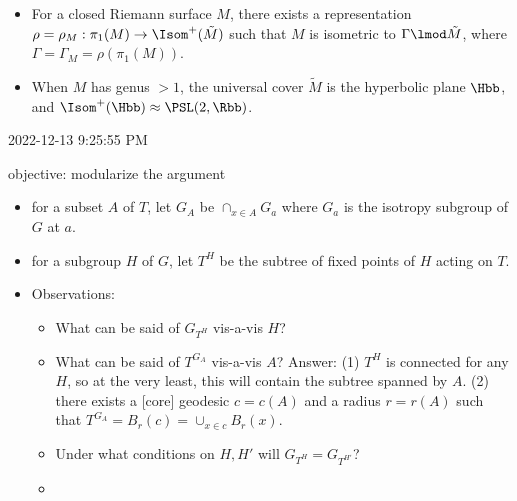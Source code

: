 \documentclass{amsart}
\begin{document}
\begin{itemize}
	\item For a closed Riemann surface $M$, there exists a representation $\rho=\rho_M : \pi_1(M) \to \Isom^+(\tilde{M})$ such that $M$ is isometric to $\Gamma \lmod \tilde{M}$, where $\Gamma=\Gamma_M = \rho(\pi_1(M))$.
	\item When $M$ has genus $>1$, the universal cover $\tilde{M}$ is the hyperbolic plane $\Hbb$, and $\Isom^+(\Hbb) \approx \PSL(2,\Rbb)$.
\end{itemize}
2022-12-13 9:25:55 PM

objective: modularize the argument
\begin{itemize}
	\item for a subset $A$ of $T$, let $G_A$ be $\cap_{x \in A}G_a$ where $G_a$ is the isotropy subgroup of $G$ at $a$.
	\item for a subgroup $H$ of $G$, let $T^H$ be the subtree of fixed points of $H$ acting on $T$.
	\item Observations:
	      \begin{itemize}
		      \item What can be said of $G_{T^H}$ vis-a-vis $H$?
		      \item What can be said of $T^{G_A}$ vis-a-vis $A$?  Answer: (1) $T^H$ is connected for any $H$, so at the very least, this will contain the subtree spanned by $A$.  (2) there exists a [core] geodesic $c=c(A)$ and a radius $r=r(A)$ such that $T^{G_A} = B_r(c) = \cup_{x \in c} B_r(x)$.
		      \item Under what conditions on $H, H'$ will $G_{T^H} = G_{T^{H'}}$?
		      \item
	      \end{itemize}
\end{itemize}
\end{document}
